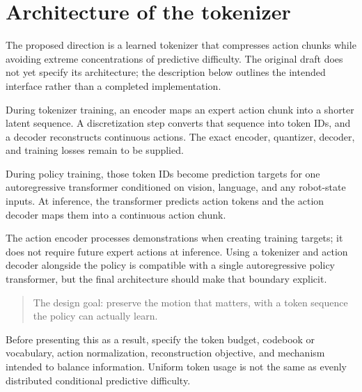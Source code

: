 \section{Architecture of the tokenizer}

The proposed direction is a learned tokenizer that compresses action chunks
while avoiding extreme concentrations of predictive difficulty. The original
draft does not yet specify its architecture; the description below outlines the
intended interface rather than a completed implementation.

During tokenizer training, an encoder maps an expert action chunk into a shorter
latent sequence. A discretization step converts that sequence into token IDs,
and a decoder reconstructs continuous actions. The exact encoder, quantizer,
decoder, and training losses remain to be supplied.

During policy training, those token IDs become prediction targets for one
autoregressive transformer conditioned on vision, language, and any robot-state
inputs. At inference, the transformer predicts action tokens and the action
decoder maps them into a continuous action chunk.

The action encoder processes demonstrations when creating training targets; it
does not require future expert actions at inference. Using a tokenizer and
action decoder alongside the policy is compatible with a single autoregressive
policy transformer, but the final architecture should make that boundary
explicit.

\begin{quote}
The design goal: preserve the motion that matters, with a token sequence the
policy can actually learn.
\end{quote}

Before presenting this as a result, specify the token budget, codebook or
vocabulary, action normalization, reconstruction objective, and mechanism
intended to balance information. Uniform token usage is not the same as evenly
distributed conditional predictive difficulty.
